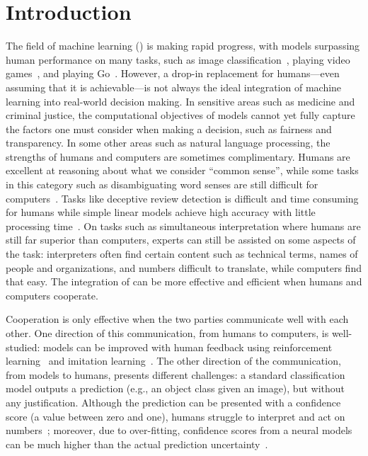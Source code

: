 \section{Introduction}
\label{sec:intro}

The field of machine learning () is making rapid progress,
with models surpassing human performance on many tasks, such as
image classification~\cite{he2015delving}, playing video
games~\cite{mnih2015human}, and playing Go~\cite{silver2017mastering}.
However, a drop-in replacement for humans---even assuming that it is
achievable---is not always the ideal integration of machine learning
into real-world decision making.
In sensitive areas such as medicine and criminal justice, the
computational objectives of  models cannot yet fully
capture the factors one must consider when making a
decision, such as fairness and transparency. In some other areas such
as natural language processing, the
strengths of humans and computers are sometimes complimentary.
Humans are excellent at reasoning about what we
consider ``common sense'', while some tasks in this category such as
disambiguating word senses are still difficult for
computers~\cite{papandrea2017supwsd}.
Tasks like deceptive review detection is difficult and time consuming
for humans while simple linear  models achieve high accuracy
with little processing time~\cite{lai2018human}.
On tasks such as simultaneous interpretation where humans are
still far superior than computers, experts can still be assisted on
some aspects of the task: interpreters often
find certain content such as technical terms, names of people and
organizations, and numbers difficult to translate, while 
computers find that easy.  The integration of 
can be more effective and efficient when humans and computers
cooperate.

Cooperation is only effective when the two parties communicate
well with each other. One direction of this communication, from
humans to computers, is well-studied:
 models can be improved with human feedback using
reinforcement learning~\cite{sutton1998introduction} and imitation
learning~\cite{ross2011reduction,ross2018regularizing}. The
other direction of the communication, from  models to
humans, presents different challenges:
a standard classification model outputs a prediction (e.g., an object
class given an image), but without any justification.
Although the prediction can be presented with a confidence score (a
value between zero and one), humans struggle to interpret and act on
numbers~\cite{peters2006numeracy, reyna2008numeracy}; moreover, due to
over-fitting, confidence scores from a neural models can be much
higher than the actual prediction
uncertainty~\cite{guo2017calibration}.

